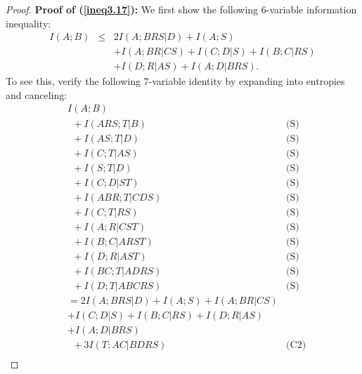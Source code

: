 \documentclass[10pt,journal]{IEEEtran}
\begin{document}
\begin{proof}
{\bf Proof of (\ref{ineq3.17}):}
We first show the following 6-variable information inequality:
\begin{eqnarray}\label{lem4.1}
   I(A;B) &\le& 2I(A;BRS|D)+I(A;S) \nonumber\\
      && +I(A;BR|CS)+I(C;D|S)+I(B;C|RS)\nonumber\\
      && +I(D;R|AS) +I(A;D|BRS).
\end{eqnarray}
To see this, verify the following 7-variable identity by expanding into entropies
and canceling:
\begin{align*}
&I(A;B)&\\
      &\ \  + I(ARS;T|B)                                                        & \text{(S)} \\
      &\ \  + I(AS;T|D)                                                         & \text{(S)} \\
      &\ \  + I(C;T|AS)                                                          & \text{(S)} \\
      &\ \  + I(S;T|D)                                                        & \text{(S)} \\
      &\ \  + I(C;D|ST)                                                      & \text{(S)} \\
      &\ \  + I(ABR;T|CDS)                                                        & \text{(S)} \\
      &\ \  + I(C;T|RS)                                                        & \text{(S)} \\
      &\ \  + I(A;R|CST)                                                       & \text{(S)} \\
      &\ \  + I(B;C|ARST)                                                         & \text{(S)} \\
      &\ \  + I(D;R|AST)                                                       & \text{(S)} \\
      &\ \  + I(BC;T|ADRS)                                                       & \text{(S)} \\
      &\ \  + I(D;T|ABCRS)                                                         & \text{(S)} \\
      & = 2I(A;BRS|D)+I(A;S)+I(A;BR|CS)&\\
      & +I(C;D|S)+I(B;C|RS)+I(D;R|AS)&\\
      & +I(A;D|BRS) &\\
      &\ \   + 3I(T;AC|BDRS)                                                     & \text{(C2)} \\

\end{align*}
\end{proof}
\end{document}
